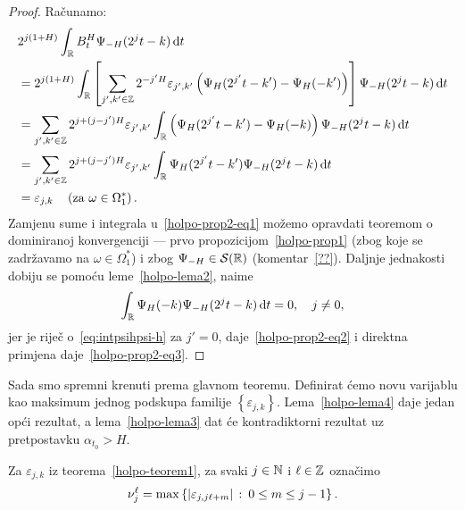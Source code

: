 \documentclass[main.tex]{subfiles}
\begin{document}
\newcommand{\grn}{_\R}
\begin{proof}
	Računamo:
	\begin{align}
		 & 2^{j(1+H)}\int\grn B^H_t\Psi_{-H}(2^jt-k) \D t                                                                                                                                \\
		 & = 2^{j(1+H)}\int\grn \left[ \sum_{j',k'\in\Z} 2^{-j'H}\varepsilon_{j',k'}\left( \Psi_H(2^{j'}t-k')-\Psi_H(-k') \right) \right] \Psi_{-H}(2^jt-k) \D t \label{holpo-prop2-eq1} \\
		 & = \sum_{j',k'\in\Z} 2^{j+(j-j')H}\varepsilon_{j',k'}
		\int\grn \left( \Psi_H(2^{j'}t-k')-\Psi_H(-k) \right)\Psi_{-H}(2^jt-k) \D t                                                                                                      \\
		 & = \sum_{j',k'\in\Z} 2^{j+(j-j')H}\varepsilon_{j',k'}
		\int\grn \Psi_H(2^{j'}t-k')\Psi_{-H}(2^jt-k) \D t \label{holpo-prop2-eq2}                                                                                                        \\
		 & = \varepsilon_{j,k} \quad \left(\text{za } \omega \in \Omega_1^*\right). \label{holpo-prop2-eq3}
	\end{align}
	Zamjenu sume i integrala u~\eqref{holpo-prop2-eq1} možemo opravdati teoremom o
	dominiranoj konvergenciji --- prvo propozicijom~\ref{holpo-prop1}
	(zbog koje se zadržavamo na \( \omega \in \Omega_1^* \)) i zbog \( \Psi_{-H} \in \mathcal S(\mathbb{R}) \)
	(komentar~\ref{??}). Daljnje jednakosti dobiju se pomoću leme~\ref{holpo-lema2}, naime
	\begin{equation}
		\int\grn \Psi_H(-k)\Psi_{-H}(2^jt-k) \D t = 0, \quad j \neq 0,
	\end{equation}
	jer je riječ o~\eqref{eq:intpsihpsi-h} za \( j'=0 \), daje~\eqref{holpo-prop2-eq2} i direktna primjena daje~\eqref{holpo-prop2-eq3}.
\end{proof}

Sada smo spremni krenuti prema glavnom teoremu.
Definirat ćemo novu varijablu kao maksimum
jednog podskupa familije \( \left\{ \varepsilon_{j,k} \right\} \).
Lema~\ref{holpo-lema4} daje jedan opći rezultat,
a lema~\ref{holpo-lema3} dat će kontradiktorni rezultat
uz pretpostavku \( \alpha_{t_0} > H \).

\begin{definicija}
	Za \( \varepsilon_{j,k} \) iz teorema~\ref{holpo-teorem1}, za svaki \( j \in \mathbb{N} \)
	i \( \ell \in \mathbb{Z} \) označimo
	\begin{equation}
		\nu_j^\ell = \max\left\{ \left| {\varepsilon_{j, j\ell+m}} \right| \, \colon \, 0 \le m \le j-1 \right\}.
	\end{equation}
\end{definicija}
\end{document}
